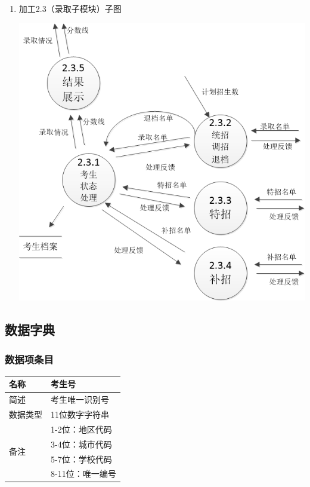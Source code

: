 \documentclass[CJK,utf8]{ctexrep}
\begin{document}
\begin{enumerate}
	\item 加工2.3（录取子模块）子图
	
	\includegraphics[scale=0.65]{DataFlowDiagram/加工2.3子图.png}
\end{enumerate}

\subsection*{数据字典}

%
%

\subsubsection*{数据项条目}

\begin{tabularx}{0.85\textwidth}{|l|X|}
	\hline
	\textbf{名称} & \textbf{考生号} \\
	\hline
	简述 & 考生唯一识别号 \\
	\hline
	数据类型 & 11位数字字符串 \\
	\hline
	\multirow{4}{*}{备注}
	& 1-2位：地区代码 \\
	& 3-4位：城市代码 \\
	& 5-7位：学校代码 \\
	& 8-11位：唯一编号 \\
	\hline
\end{tabularx}
\end{document}
